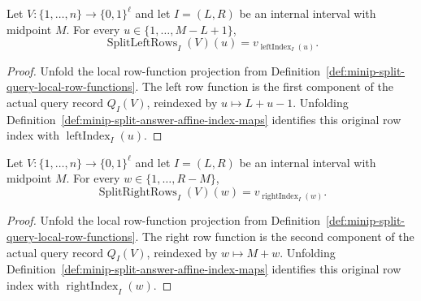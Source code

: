\begin{lemma}
  \label{lem:minip-split-query-left-row-affine}
  Let $V:\{1,\ldots,n\}\to\{0,1\}^{\ell}$ and let $I=(L,R)$ be an internal
  interval with midpoint $M$.  For every
  $u\in\{1,\ldots,M-L+1\}$,
  \[
    \operatorname{SplitLeftRows}_I(V)(u)
      =
    v_{\operatorname{leftIndex}_I(u)}.
  \]
\end{lemma}
\begin{proof}
  Unfold the local row-function projection from
  Definition~\ref{def:minip-split-query-local-row-functions}.  The left row
  function is the first component of the actual query record $Q_I(V)$,
  reindexed by $u\mapsto L+u-1$.  Unfolding
  Definition~\ref{def:minip-split-answer-affine-index-maps} identifies this
  original row index with $\operatorname{leftIndex}_I(u)$.
\end{proof}

\begin{lemma}
  \label{lem:minip-split-query-right-row-affine}
  Let $V:\{1,\ldots,n\}\to\{0,1\}^{\ell}$ and let $I=(L,R)$ be an internal
  interval with midpoint $M$.  For every
  $w\in\{1,\ldots,R-M\}$,
  \[
    \operatorname{SplitRightRows}_I(V)(w)
      =
    v_{\operatorname{rightIndex}_I(w)}.
  \]
\end{lemma}
\begin{proof}
  Unfold the local row-function projection from
  Definition~\ref{def:minip-split-query-local-row-functions}.  The right row
  function is the second component of the actual query record $Q_I(V)$,
  reindexed by $w\mapsto M+w$.  Unfolding
  Definition~\ref{def:minip-split-answer-affine-index-maps} identifies this
  original row index with $\operatorname{rightIndex}_I(w)$.
\end{proof}

